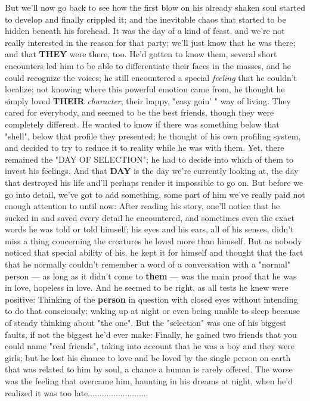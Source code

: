 But we'll now go back to see how the first blow on his already shaken soul started to develop and finally crippled it; and the inevitable chaos that started to be hidden beneath his forehead. 
It was the day of a kind of feast, and we're not really interested in the reason for that party; we'll just know that he was there; and that \textbf{THEY} were there, too. He'd gotten to know them, several short encounters led him to be able to differentiate their faces in the masses, and he could recognize the voices; he still encountered a special \emph{feeling} that he couldn't localize; not knowing where this powerful emotion came from, he thought he simply loved \textbf{THEIR} \emph{character}, their happy, "easy goin' " way of living. They cared for everybody, and seemed to be the best friends, though they were completely different. He wanted to know if there was something below that "shell", below that profile they presented; he thought of his own profiling system, and decided to try to reduce it to reality while he was with them. Yet, there remained the "DAY OF SELECTION"; he had to decide into which of them to invest his feelings. And that \textbf{DAY} is the day we're currently looking at, the day that destroyed his life and'll perhaps render it impossible to go on. 
But before we go into detail, we've got to add something, some part of him we've really paid not enough attention to until now: After reading his story, one'll notice that he sucked in and saved every detail he encountered, and sometimes even the exact words he was told or told himself; his eyes and his ears, all of his senses, didn't miss a thing concerning the creatures he loved more than himself. But as nobody noticed that special ability of his, he kept it for himself and thought that the fact that he normally couldn't remember a word of a conversation with a "normal" person --- as long as it didn't come to \textbf{them} --- was the main proof that he was in love, hopeless in love. And he seemed to be right, as all tests he knew were positive: Thinking of the \textbf{person} in question with closed eyes without intending to do that consciously; waking up at night or even being unable to sleep because of steady thinking about "the one". But the "selection" was one of his biggest faults, if not the biggest he'd ever make: Finally, he gained two friends that you could name "real friends", taking into account that he was a boy and they were girls; but he lost his chance to love and be loved by the single person on earth that was related to him by soul, a chance a human is rarely offered. The worse was the feeling that overcame him, haunting in his dreams at night, when he'd realized it was too late..........................
